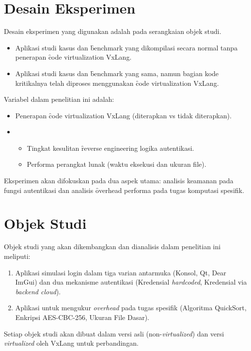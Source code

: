 \section{Desain Eksperimen}
Desain eksperimen yang digunakan adalah  pada serangkaian objek studi.
\begin{itemize}
    \item {} Aplikasi studi kasus dan \f{benchmark} yang dikompilasi secara normal tanpa penerapan \f{code virtualization} VxLang.
    \item {} Aplikasi studi kasus dan \f{benchmark} yang sama, namun bagian kode kritikalnya telah diproses menggunakan \f{code virtualization} VxLang.
\end{itemize}
Variabel dalam penelitian ini adalah:
\begin{itemize}
    \item {} Penerapan \f{code virtualization} VxLang (diterapkan vs tidak diterapkan).
    \item {}
        \begin{itemize}
            \item Tingkat kesulitan \f{reverse engineering} logika autentikasi.
            \item Performa perangkat lunak (waktu eksekusi dan ukuran file).
        \end{itemize}
\end{itemize}
Eksperimen akan difokuskan pada dua aspek utama: analisis keamanan pada fungsi autentikasi dan analisis \f{overhead} performa pada tugas komputasi spesifik.

\section{Objek Studi}
Objek studi yang akan dikembangkan dan dianalisis dalam penelitian ini meliputi:
\begin{enumerate}
    \item {} Aplikasi simulasi login dalam tiga varian antarmuka (Konsol, Qt, Dear ImGui) dan dua mekanisme autentikasi (Kredensial \textit{hardcoded}, Kredensial via \textit{backend cloud}).
    \item {} Aplikasi untuk mengukur \textit{overhead} pada tugas spesifik (Algoritma QuickSort, Enkripsi AES-CBC-256, Ukuran File Dasar).
\end{enumerate}
Setiap objek studi akan dibuat dalam versi asli (non-\textit{virtualized}) dan versi \textit{virtualized} oleh VxLang untuk perbandingan.

